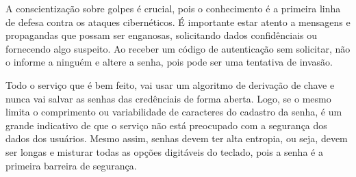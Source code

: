 \documentclass[12pt]{article}
\begin{document}
A conscientização sobre golpes é crucial, pois o conhecimento é a primeira linha de defesa contra
os ataques cibernéticos.
É importante estar atento a mensagens e propagandas que possam ser enganosas, solicitando dados
confidênciais ou fornecendo algo suspeito.
Ao receber um código de autenticação sem solicitar, não o informe a ninguém e altere a senha,
pois pode ser uma tentativa de invasão.

Todo o serviço que é bem feito, vai usar um algoritmo de derivação de chave e nunca vai salvar
as senhas das credênciais de forma aberta.
Logo, se o mesmo limita o comprimento ou variabilidade de caracteres do cadastro da senha, é um
grande indicativo de que o serviço não está preocupado com a segurança dos dados dos usuários.
Mesmo assim, senhas devem ter alta entropia, ou seja, devem ser longas e misturar todas as opções
digitáveis do teclado, pois a senha é a primeira barreira de segurança.



\end{document}
